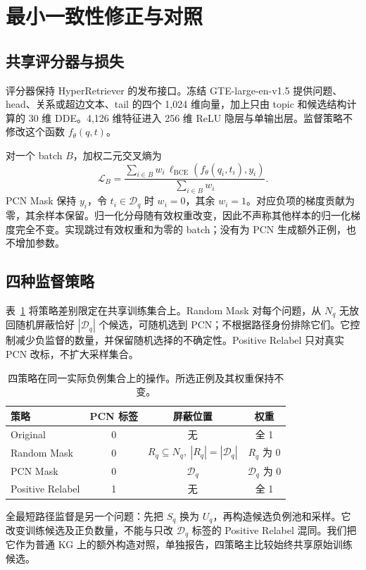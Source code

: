 \documentclass[UTF8,a4paper,10pt,fontset=fandol]{ctexart}
\newcommand{\pcn}{\mathcal D_q}
\begin{document}
\section{最小一致性修正与对照}
\subsection{共享评分器与损失}
评分器保持 HyperRetriever 的发布接口\cite{hyperrag}。冻结 GTE-large-en-v1.5 提供问题、head、关系或超边文本、tail 的四个 1,024 维向量，加上只由 topic 和候选结构计算的 30 维 DDE。4,126 维特征进入 256 维 ReLU 隐层与单输出层。监督策略不修改这个函数 $f_\theta(q,t)$。

对一个 batch $B$，加权二元交叉熵为
\begin{equation}
\mathcal L_B=\frac{\sum_{i\in B}w_i\,\ell_{\mathrm{BCE}}(f_\theta(q_i,t_i),y_i)}{\sum_{i\in B}w_i}.
\label{eq:loss}
\end{equation}
PCN Mask 保持 $y_i$，令 $t_i\in\pcn$ 时 $w_i=0$，其余 $w_i=1$。对应负项的梯度贡献为零，其余样本保留。归一化分母随有效权重改变，因此不声称其他样本的归一化梯度完全不变。实现跳过有效权重和为零的 batch；没有为 PCN 生成额外正例，也不增加参数。

\subsection{四种监督策略}
表~\ref{tab:strategies} 将策略差别限定在共享训练集合上。Random Mask 对每个问题，从 $N_q$ 无放回随机屏蔽恰好 $|\pcn|$ 个候选，可随机选到 PCN；不根据路径身份排除它们。它控制减少负监督的数量，并保留随机选择的不确定性。Positive Relabel 只对真实 PCN 改标，不扩大采样集合。

\begin{table}[tbp]\centering
\caption{四策略在同一实际负例集合上的操作。所选正例及其权重保持不变。}\label{tab:strategies}
\begin{tabular}{lccc}\toprule
策略 & PCN 标签 & 屏蔽位置 & 权重 \\\midrule
Original & 0 & 无 & 全 1 \\
Random Mask & 0 & $R_q\subseteq N_q,\ |R_q|=|\pcn|$ & $R_q$ 为 0 \\
PCN Mask & 0 & $\pcn$ & $\pcn$ 为 0 \\
Positive Relabel & 1 & 无 & 全 1 \\\bottomrule
\end{tabular}
\end{table}

全最短路径监督是另一个问题：先把 $S_q$ 换为 $U_q$，再构造候选负例池和采样。它改变训练候选及正负数量，不能与只改 $\pcn$ 标签的 Positive Relabel 混同。我们把它作为普通 KG 上的额外构造对照，单独报告，四策略主比较始终共享原始训练候选。
\end{document}
